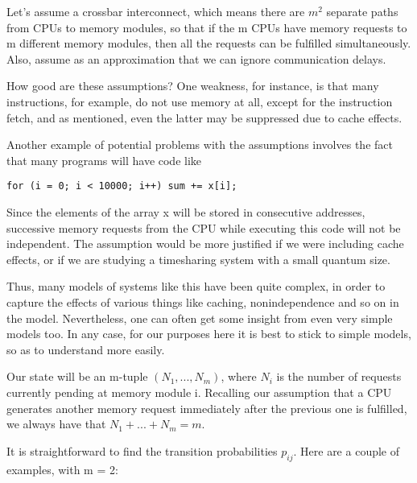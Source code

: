 Let's assume a crossbar interconnect, which means there are $m^2$
separate paths from CPUs to memory modules, so that if the m CPUs have
memory requests to m different memory modules, then all the requests can
be fulfilled simultaneously.  Also, assume as an approximation that we
can ignore communication delays.

How good are these assumptions?  One weakness, for instance, is that
many instructions, for example, do not use memory at all, except for the
instruction fetch, and as mentioned, even the latter may be suppressed
due to cache effects.  

Another example of potential problems with the assumptions involves the
fact that many programs will have code like

\begin{verbatim}
for (i = 0; i < 10000; i++) sum += x[i];
\end{verbatim}

Since the elements of the array x will be stored in consecutive
addresses, successive memory requests from the CPU while executing this
code will not be independent.  The assumption would be more justified if
we were including cache effects, or if we are studying a timesharing
system with a small quantum size.  

Thus, many models of systems like this have been quite complex, in order
to capture the effects of various things like caching, nonindependence
and so on in the model.  Nevertheless, one can often get some insight
from even very simple models too.  In any case, for our purposes here it
is best to stick to simple models, so as to understand more easily.

Our state will be an m-tuple $(N_{1},...,N_{m})$, where $N_{i}$ is the
number of requests currently pending at memory module i.  Recalling our
assumption that a CPU generates another memory request immediately after
the previous one is fulfilled, we always have that $N_{1}+...+N_{m}=m$.

It is straightforward to find the transition probabilities $p_{ij}$.
Here are a couple of examples, with m = 2:

